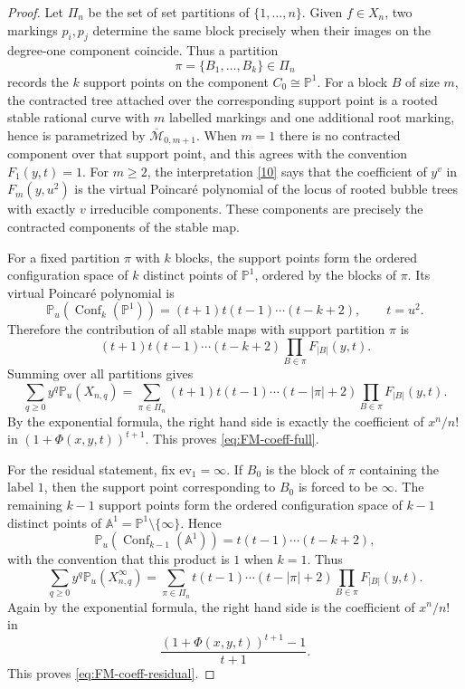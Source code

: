 \documentclass[10pt,a4paper]{amsart}
\newcommand{\Mbar}{\overline{\mathcal M}}
\newcommand{\PP}{\mathbb{P}}
\begin{document}
\begin{proof}
Let $\Pi_n$ be the set of set partitions of $\{1,\ldots,n\}$.  Given
$f\in X_n$, two markings $p_i,p_j$ determine the same block precisely when
their images on the degree-one component coincide.  Thus a partition
\[
  \pi=\{B_1,\ldots,B_k\}\in \Pi_n
\]
records the $k$ support points on the component $C_0\cong \PP^1$.
For a block $B$ of size $m$, the contracted tree attached over the
corresponding support point is a rooted stable rational curve with $m$ labelled
markings and one additional root marking, hence is parametrized by
$\Mbar_{0,m+1}$.  When $m=1$ there is no contracted component over that
support point, and this agrees with the convention $F_1(y,t)=1$.
For $m\ge 2$, the interpretation \eqref{10} says that the coefficient of
$y^v$ in $F_m(y,u^2)$ is the virtual Poincar\'e polynomial of the locus of
rooted bubble trees with exactly $v$ irreducible components.  These components
are precisely the contracted components of the stable map.

For a fixed partition $\pi$ with $k$ blocks, the support points form the
ordered configuration space of $k$ distinct points of $\PP^1$, ordered by the
blocks of $\pi$.  Its virtual Poincar\'e polynomial is
\[
  \PP_u(\operatorname{Conf}_k(\PP^1))
  =(t+1)t(t-1)\cdots(t-k+2),
  \qquad t=u^2.
\]
Therefore the contribution of all stable maps with support partition $\pi$ is
\[
  (t+1)t(t-1)\cdots(t-k+2)\prod_{B\in \pi}F_{|B|}(y,t).
\]
Summing over all partitions gives
\begin{equation}\label{eq:FM-partition-full}
  \sum_{q\ge 0}y^q\PP_u(X_{n,q})
  =
  \sum_{\pi\in\Pi_n}
  (t+1)t(t-1)\cdots(t-|\pi|+2)
  \prod_{B\in\pi}F_{|B|}(y,t).
\end{equation}
By the exponential formula, the right hand side is exactly the coefficient of
$x^n/n!$ in $(1+\Phi(x,y,t))^{t+1}$.  This proves
\eqref{eq:FM-coeff-full}.

For the residual statement, fix $\mathrm{ev}_1=\infty$.  If $B_0$ is the
block of $\pi$ containing the label $1$, then the support point corresponding
to $B_0$ is forced to be $\infty$.  The remaining $k-1$ support points form
the ordered configuration space of $k-1$ distinct points of
$\mathbb A^1=\PP^1\setminus\{\infty\}$.  Hence
\[
  \PP_u(\operatorname{Conf}_{k-1}(\mathbb A^1))
  =t(t-1)\cdots(t-k+2),
\]
with the convention that this product is $1$ when $k=1$.  Thus
\begin{equation}\label{eq:FM-partition-residual}
  \sum_{q\ge 0}y^q\PP_u(X_{n,q}^{\infty})
  =
  \sum_{\pi\in\Pi_n}
  t(t-1)\cdots(t-|\pi|+2)
  \prod_{B\in\pi}F_{|B|}(y,t).
\end{equation}
Again by the exponential formula, the right hand side is the coefficient of
$x^n/n!$ in
\[
  \frac{(1+\Phi(x,y,t))^{t+1}-1}{t+1}.
\]
This proves \eqref{eq:FM-coeff-residual}.
\end{proof}
\end{document}
